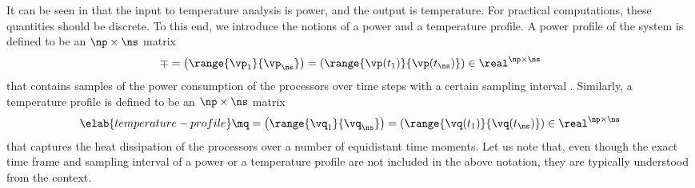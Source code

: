 It can be seen in  that the input to
temperature analysis is power, and the output is temperature. For practical
computations, these quantities should be discrete. To this end, we introduce the
notions of a power and a temperature profile. A power profile of the system is
defined to be an $\np \times \ns$ matrix
\[
  \mp
  = \left(\range{\vp_1}{\vp_\ns}\right)
  = \left(\range{\vp(t_1)}{\vp(t_\ns)}\right) \in \real^{\np \times \ns}
\]
that contains \ns samples of the power consumption of the \np processors over
\ns time steps with a certain sampling interval \dt. Similarly, a temperature
profile is defined to be an $\np \times \ns$ matrix
\begin{equation} \elab{temperature-profile}
  \mq
  = \left(\range{\vq_1}{\vq_\ns}\right)
  = \left(\range{\vq(t_1)}{\vq(t_\ns)}\right) \in \real^{\np \times \ns}
\end{equation}
that captures the heat dissipation of the processors over a number of
equidistant time moments. Let us note that, even though the exact time frame and
sampling interval of a power or a temperature profile are not included in the
above notation, they are typically understood from the context.
